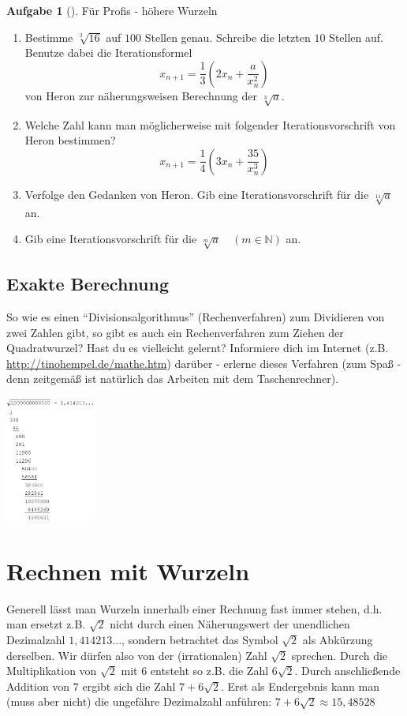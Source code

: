 \documentclass[a4paper, twoside, parskip, 10pt, smallheadings]{scrbook}
\theoremstyle{plain}
\theoremstyle{definition}
\newtheorem{Auf}{Aufgabe}%
\newenvironment{fshaded}{%
\def\FrameCommand{\fcolorbox{framecolor}{shadecolor}}%
\MakeFramed {\FrameRestore}}%
{\endMakeFramed}
\newenvironment{fauf}[1][]{\definecolor{shadecolor}{rgb}{.58,.788,1}%
\definecolor{framecolor}{rgb}{.13,.25,.9}%
\begin{fshaded}\begin{Auf}[#1]}{\end{Auf}\end{fshaded}}
\newcommand{\ba}{\begin{fauf}}
\newcommand{\ea}{\end{fauf}}
\newcommand{\bn}{\begin{enumerate}}
\newcommand{\en}{\end{enumerate}}
\begin{document}
\ba Für Profis - höhere Wurzeln 
\bn \item Bestimme $\sqrt[3]{16}$ auf $100$ Stellen genau.
Schreibe die letzten $10$ Stellen auf. Benutze dabei die Iterationsformel
$$x_{n+1}=\frac13\left(2x_n+\frac{a}{x_n^2}\right)$$ von Heron zur näherungsweisen Berechnung der $\sqrt[3]{a}$.
\item Welche Zahl kann man möglicherweise mit folgender Iterationsvorschrift von Heron
bestimmen?$$x_{n+1}=\frac14\left(3x_n+\frac{35}{x_n^3}\right)$$
\item Verfolge den Gedanken von Heron. Gib eine Iterationsvorschrift für die $\sqrt[11]{a}$ an. \item Gib
eine Iterationsvorschrift für die $\sqrt[m]{a} \quad (m \in \mathbb{N})$ an.
 \en \ea




\subsection{Exakte Berechnung}

\begin{minipage}{11cm}
So wie es einen "`Divisionsalgorithmus"' (Rechenverfahren) zum Dividieren von zwei Zahlen gibt, so gibt es auch ein Rechenverfahren zum Ziehen der Quadratwurzel? Hast du es vielleicht gelernt?
Informiere dich im Internet (z.B. \href{http://tinohempel.de/mathe.htm}{http://tinohempel.de/mathe.htm}) darüber - erlerne dieses Verfahren (zum Spaß - denn zeitgemäß ist natürlich das Arbeiten mit dem Taschenrechner).
\end{minipage}
\begin{minipage}{3cm}
\includegraphics[width=3cm]{2te/reellezahlen/bilder/namenlos.jpg}
\end{minipage}




\section{Rechnen mit Wurzeln}

Generell l\"{a}sst man Wurzeln innerhalb einer Rechnung fast immer
stehen, d.h. man ersetzt z.B. $\sqrt{2}$ nicht durch einen
N\"{a}herungswert der unendlichen Dezimalzahl $1,414213\dots$, sondern
betrachtet das Symbol $\sqrt{2}$ als Abk\"{u}rzung derselben. Wir
d\"{u}rfen also von der (irrationalen) Zahl $\sqrt{2}$ sprechen. Durch
die Multiplikation von $\sqrt{2}$ mit $6$ entsteht so z.B. die
Zahl $6 \sqrt{2}$. Durch anschlie{\ss}ende Addition von $7$ ergibt
sich die Zahl $7+ 6 \sqrt{2}$. Erst als Endergebnis kann man (muss
aber nicht) die ungef\"{a}hre Dezimalzahl anf\"{u}hren: $7+6 \sqrt{2}
\approx 15,48528$
\end{document}
